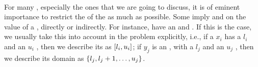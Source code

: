 \begin{definition}
\paragraph{}
For many , especially the ones that we are going to discuss, it is of eminent importance to restrict the  of the  as much as possible. Some  imply  and  on the value of a , directly or indirectly. For instance,  have an  and . If this is the case, we usually take this into account in the problem  explicitly, i.e., if a  $x_i$ has a  $l_i$ and an  $u_i$ , then we describe its  as $\left[ l_i,u_i \right]$; if $y_j$ is an , with a  $l_j$ and an  $u_j$ , then we describe its domain as $\left\{ l_j,l_j+1,\ldots,u_j \right\}$.


\end{definition}
